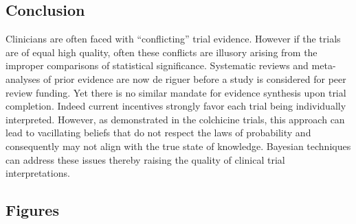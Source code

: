 \documentclass[
  letterpaper,
  DIV=11,
  numbers=noendperiod]{scrartcl}
\begin{document}
\subsection{Conclusion}\label{conclusion}

Clinicians are often faced with ``conflicting'' trial evidence. However
if the trials are of equal high quality, often these conflicts are
illusory arising from the improper comparisons of statistical
significance. Systematic reviews and meta-analyses of prior evidence are
now de riguer before a study is considered for peer review funding. Yet
there is no similar mandate for evidence synthesis upon trial
completion. Indeed current incentives strongly favor each trial being
individually interpreted. However, as demonstrated in the colchicine
trials, this approach can lead to vacillating beliefs that do not
respect the laws of probability and consequently may not align with the
true state of knowledge. Bayesian techniques can address these issues
thereby raising the quality of clinical trial interpretations.\\

\subsection{Figures}\label{figures}
\end{document}
